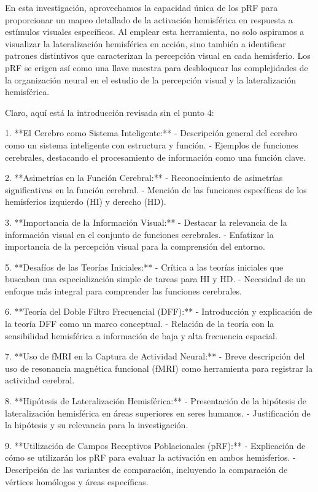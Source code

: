 \documentclass{article}
\begin{document}
	En esta investigación, aprovechamos la capacidad única de los pRF para proporcionar un mapeo detallado de la activación hemisférica en respuesta a estímulos visuales específicos. Al emplear esta herramienta, no solo aspiramos a visualizar la lateralización hemisférica en acción, sino también a identificar patrones distintivos que caracterizan la percepción visual en cada hemisferio. Los pRF se erigen así como una llave maestra para desbloquear las complejidades de la organización neural en el estudio de la percepción visual y la lateralización hemisférica.
	\newpage
	
	Claro, aquí está la introducción revisada sin el punto 4:
	
	1. **El Cerebro como Sistema Inteligente:**
	- Descripción general del cerebro como un sistema inteligente con estructura y función.
	- Ejemplos de funciones cerebrales, destacando el procesamiento de información como una función clave.
	
	2. **Asimetrías en la Función Cerebral:**
	- Reconocimiento de asimetrías significativas en la función cerebral.
	- Mención de las funciones específicas de los hemisferios izquierdo (HI) y derecho (HD).
	
	3. **Importancia de la Información Visual:**
	- Destacar la relevancia de la información visual en el conjunto de funciones cerebrales.
	- Enfatizar la importancia de la percepción visual para la comprensión del entorno.
	
	5. **Desafíos de las Teorías Iniciales:**
	- Crítica a las teorías iniciales que buscaban una especialización simple de tareas para HI y HD.
	- Necesidad de un enfoque más integral para comprender las funciones cerebrales.
	
	6. **Teoría del Doble Filtro Frecuencial (DFF):**
	- Introducción y explicación de la teoría DFF como un marco conceptual.
	- Relación de la teoría con la sensibilidad hemisférica a información de baja y alta frecuencia espacial.
	
	7. **Uso de fMRI en la Captura de Actividad Neural:**
	- Breve descripción del uso de resonancia magnética funcional (fMRI) como herramienta para registrar la actividad cerebral.
	
	8. **Hipótesis de Lateralización Hemisférica:**
	- Presentación de la hipótesis de lateralización hemisférica en áreas superiores en seres humanos.
	- Justificación de la hipótesis y su relevancia para la investigación.
	
	9. **Utilización de Campos Receptivos Poblacionales (pRF):**
	- Explicación de cómo se utilizarán los pRF para evaluar la activación en ambos hemisferios.
	- Descripción de las variantes de comparación, incluyendo la comparación de vértices homólogos y áreas específicas.
	
\end{document}
